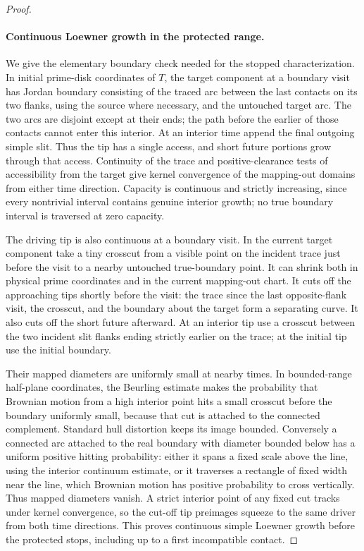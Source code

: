\begin{proof}
\paragraph{Continuous Loewner growth in the protected range.}
We give the elementary boundary check needed for the stopped characterization.  In initial prime-disk coordinates of $T$, the target component at a boundary visit has Jordan boundary consisting of the traced arc between the last contacts on its two flanks, using the source where necessary, and the untouched target arc.  The two arcs are disjoint except at their ends; the path before the earlier of those contacts cannot enter this interior.  At an interior time append the final outgoing simple slit.  Thus the tip has a single access, and short future portions grow through that access.  Continuity of the trace and positive-clearance tests of accessibility from the target give kernel convergence of the mapping-out domains from either time direction.  Capacity is continuous and strictly increasing, since every nontrivial interval contains genuine interior growth; no true boundary interval is traversed at zero capacity.

The driving tip is also continuous at a boundary visit.  In the current target component take a tiny crosscut from a visible point on the incident trace just before the visit to a nearby untouched true-boundary point.  It can shrink both in physical prime coordinates and in the current mapping-out chart.  It cuts off the approaching tips shortly before the visit: the trace since the last opposite-flank visit, the crosscut, and the boundary about the target form a separating curve.  It also cuts off the short future afterward.  At an interior tip use a crosscut between the two incident slit flanks ending strictly earlier on the trace; at the initial tip use the initial boundary.

Their mapped diameters are uniformly small at nearby times.  In bounded-range half-plane coordinates, the Beurling estimate makes the probability that Brownian motion from a high interior point hits a small crosscut before the boundary uniformly small, because that cut is attached to the connected complement.  Standard hull distortion keeps its image bounded.  Conversely a connected arc attached to the real boundary with diameter bounded below has a uniform positive hitting probability: either it spans a fixed scale above the line, using the interior continuum estimate, or it traverses a rectangle of fixed width near the line, which Brownian motion has positive probability to cross vertically.  Thus mapped diameters vanish.  A strict interior point of any fixed cut tracks under kernel convergence, so the cut-off tip preimages squeeze to the same driver from both time directions.  This proves continuous simple Loewner growth before the protected stops, including up to a first incompatible contact.


\end{proof}
